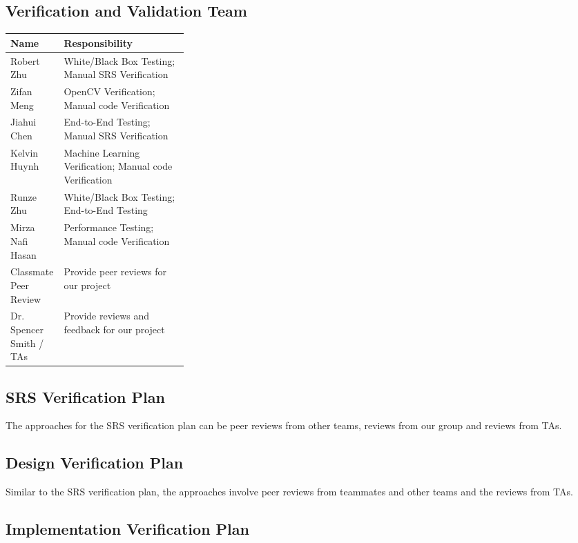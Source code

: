 \documentclass[12pt]{article}
\begin{document}
\subsection{Verification and Validation Team}

\renewcommand{\arraystretch}{1.2}
\noindent \begin{tabularx}{\textwidth}{p{0.3\linewidth}|X}
\toprule
\textbf{Name} & \textbf{Responsibility}\\
\midrule
Robert Zhu
& White/Black Box Testing; Manual SRS Verification\\ \hline
Zifan Meng
& OpenCV Verification; Manual code Verification\\ \hline
Jiahui Chen
& End-to-End Testing; Manual SRS Verification\\ \hline
Kelvin Huynh
& Machine Learning Verification; Manual code Verification\\ \hline
Runze Zhu
& White/Black Box Testing; End-to-End Testing\\ \hline
Mirza Nafi Hasan
& Performance Testing; Manual code Verification\\ \hline
Classmate Peer Review
& Provide peer reviews for our project\\ \hline
Dr. Spencer Smith / TAs
& Provide reviews and feedback for our project\\
\bottomrule
\end{tabularx}

\subsection{SRS Verification Plan}
The approaches for the SRS verification plan can be peer reviews from other teams, reviews from our group and reviews from TAs.


\subsection{Design Verification Plan}
Similar to the SRS verification plan, the approaches involve peer reviews from teammates and other teams and the reviews from TAs.


\subsection{Implementation Verification Plan}

\end{document}
